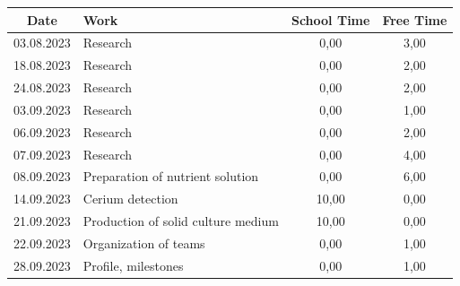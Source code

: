 \begin{longtable}{|c|p{7cm}|c|c|}
    \hline
    \textbf{Date} & \textbf{Work}                                                                                                   & \textbf{School Time} & \textbf{Free Time} \\ \endhead \hline
    03.08.2023    & Research                                                                                                        & 0,00                 & 3,00              \\ \hline
    18.08.2023    & Research                                                                                                        & 0,00                 & 2,00              \\ \hline
    24.08.2023    & Research                                                                                                        & 0,00                 & 2,00              \\ \hline
    03.09.2023    & Research                                                                                                        & 0,00                 & 1,00              \\ \hline
    06.09.2023    & Research                                                                                                        & 0,00                 & 2,00              \\ \hline
    07.09.2023    & Research                                                                                                        & 0,00                 & 4,00              \\ \hline
    08.09.2023    & Preparation of nutrient solution                                                                                & 0,00                 & 6,00              \\ \hline
    14.09.2023    & Cerium detection                                                                                                & 10,00                & 0,00              \\ \hline
    21.09.2023    & Production of solid culture medium                                                                              & 10,00                & 0,00              \\ \hline
    22.09.2023    & Organization of teams                                                                                           & 0,00                 & 1,00              \\ \hline
    28.09.2023    & Profile, milestones                                                                                             & 0,00                 & 1,00              \\ \hline

\end{longtable}
